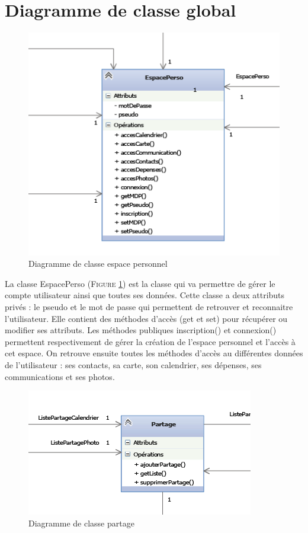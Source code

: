 \documentclass[11pt]{article}
\begin{document}
\section{Diagramme de classe global}
\begin{figure}[!h]
        \centering \includegraphics[scale=2]{espace.png}
        \caption{Diagramme de classe espace personnel}
         \label{fig:espace}
\end{figure}

La classe EspacePerso (\textsc{Figure \ref{fig:espace}}) est la classe qui va permettre de gérer le compte utilisateur ainsi que toutes ses données. Cette classe a deux attributs privés : le pseudo et le mot de passe qui permettent de retrouver et reconnaitre l'utilisateur. Elle contient des méthodes d'accès (get et set) pour récupérer ou modifier ses attributs. Les méthodes publiques inscription() et connexion() permettent respectivement de gérer la création de l'espace personnel et l'accès à cet espace. On retrouve ensuite toutes les méthodes d'accès au différentes données de l'utilisateur : ses contacts, sa carte, son calendrier, ses dépenses, ses communications et ses photos. 


\begin{figure}[!h]
        \centering \includegraphics[scale=2]{partage.png}
        \caption{Diagramme de classe partage}
         \label{fig:partage}
\end{figure}
\end{document}
